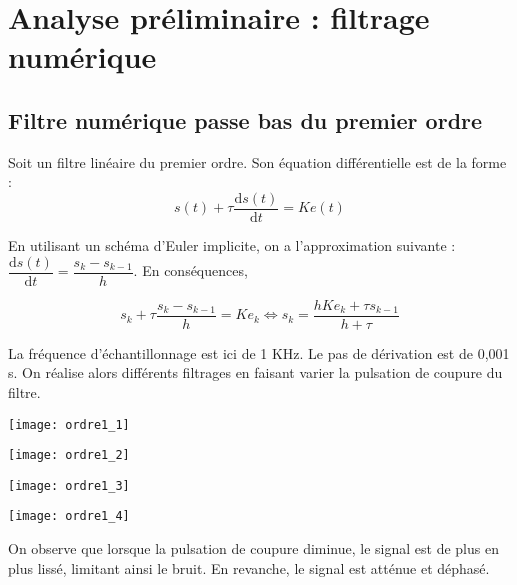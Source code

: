 \section{Analyse préliminaire : filtrage numérique}


\subsection{Filtre numérique passe bas du premier ordre}
Soit un filtre linéaire du premier ordre. Son équation différentielle est de la forme :
$$
s(t)+\tau \dfrac{\text{d} s(t) }{\text{d}t} = K e(t)
$$

En utilisant un schéma d'Euler implicite, on a l'approximation suivante : $\dfrac{\text{d} s(t) }{\text{d}t} = \dfrac{s_{k}-s_{k-1}}{h}$. En conséquences, 

$$
s_k+\tau \dfrac{s_{k}-s_{k-1}}{h} = K e_k \Leftrightarrow 
s_k = \dfrac{h K e_k+\tau s_{k-1}}{h+\tau}
$$

La fréquence d'échantillonnage est ici de 1 KHz. Le pas de dérivation est de 0,001 s. On réalise alors différents filtrages en faisant varier la pulsation de coupure du filtre. 

\begin{minipage}[c]{.43\linewidth}
\begin{center}
\texttt{[image: ordre1\_1]}
\end{center}
\end{minipage} \hfill
\begin{minipage}[c]{.43\linewidth}
\begin{center}
\texttt{[image: ordre1\_2]}
\end{center}
\end{minipage} 

\begin{minipage}[c]{.43\linewidth}
\begin{center}
\texttt{[image: ordre1\_3]}
\end{center}
\end{minipage} \hfill
\begin{minipage}[c]{.43\linewidth}
\begin{center}
\texttt{[image: ordre1\_4]}
\end{center}
\end{minipage}

On observe que lorsque la pulsation de coupure diminue, le signal est de plus en plus lissé, limitant ainsi le bruit. En revanche, le signal est atténue et déphasé. 





